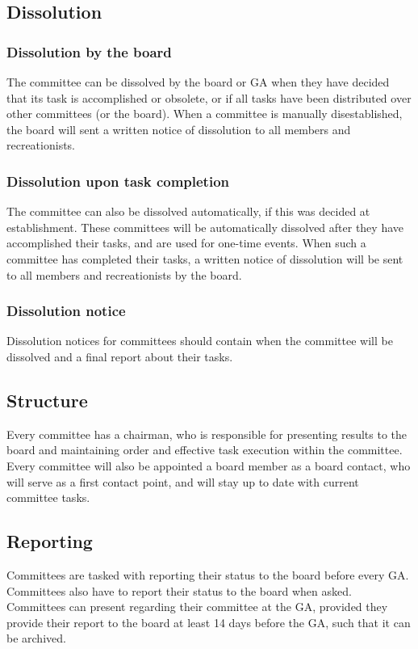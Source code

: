 \documentclass[a4paper]{article}
\begin{document}
\subsection{Dissolution}
\subsubsection{Dissolution by the board}
The committee can be dissolved by the board or GA when they have decided that its task is accomplished or obsolete, or if all tasks have been distributed over other committees (or the board). When a committee is manually disestablished, the board will sent a written notice of dissolution to all members and recreationists.

\subsubsection{Dissolution upon task completion}
The committee can also be dissolved automatically, if this was decided at establishment. These committees will be automatically dissolved after they have accomplished their tasks, and are used for one-time events. When such a committee has completed their tasks, a written notice of dissolution will be sent to all members and recreationists by the board.

\subsubsection{Dissolution notice}
Dissolution notices for committees should contain when the committee will be dissolved and a final report about their tasks.

\subsection{Structure}
Every committee has a chairman, who is responsible for presenting results to the board and maintaining order and effective task execution within the committee. Every committee will also be appointed a board member as a board contact, who will serve as a first contact point, and will stay up to date with current committee tasks.

\subsection{Reporting}
Committees are tasked with reporting their status to the board before every GA. Committees also have to report their status to the board when asked. Committees can present regarding their committee at the GA, provided they provide their report to the board at least 14 days before the GA, such that it can be archived.
\end{document}
